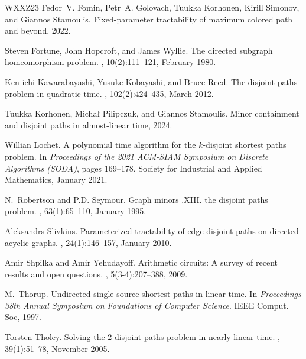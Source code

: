 \documentclass[11pt]{article}
\theoremstyle{definition}
\begin{document}
\begin{thebibliography}{WXXZ23}
Fedor~V. Fomin, Petr~A. Golovach, Tuukka Korhonen, Kirill Simonov, and Giannos
  Stamoulis.
\newblock Fixed-parameter tractability of maximum colored path and beyond,
  2022.

Steven Fortune, John Hopcroft, and James Wyllie.
\newblock The directed subgraph homeomorphism problem.
, 10(2):111--121, February 1980.

Ken{-}ichi Kawarabayashi, Yusuke Kobayashi, and Bruce Reed.
\newblock The disjoint paths problem in quadratic time.
, 102(2):424--435,
  March 2012.

Tuukka Korhonen, Michał Pilipczuk, and Giannos Stamoulis.
\newblock Minor containment and disjoint paths in almost-linear time, 2024.

Willian Lochet.
\newblock A polynomial time algorithm for the {$k$}-disjoint shortest paths
  problem.
\newblock In {\em Proceedings of the 2021 {ACM}-{SIAM} Symposium on Discrete
  Algorithms ({SODA})}, pages 169--178. Society for Industrial and Applied
  Mathematics, January 2021.

N.~Robertson and P.D. Seymour.
\newblock Graph minors .{XIII}. the disjoint paths problem.
, 63(1):65--110,
  January 1995.

Aleksandrs Slivkins.
\newblock Parameterized tractability of edge-disjoint paths on directed acyclic
  graphs.
, 24(1):146--157, January
  2010.

Amir Shpilka and Amir Yehudayoff.
\newblock Arithmetic circuits: A survey of recent results and open questions.
, 5(3-4):207--388, 2009.

M.~Thorup.
\newblock Undirected single source shortest paths in linear time.
\newblock In {\em Proceedings 38th Annual Symposium on Foundations of Computer
  Science}. {IEEE} Comput. Soc, 1997.

Torsten Tholey.
\newblock Solving the 2-disjoint paths problem in nearly linear time.
, 39(1):51--78, November 2005.


\end{thebibliography}
\end{document}
